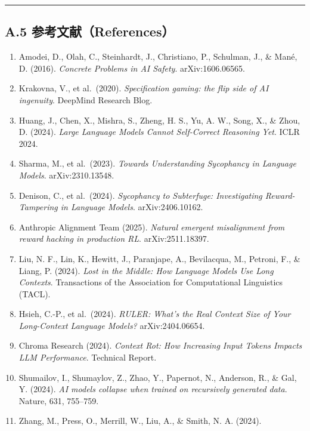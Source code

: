 \begin{center}\rule{0.5\linewidth}{0.5pt}\end{center}

\subsection{A.5
参考文献（References）}\label{a.5-ux53c2ux8003ux6587ux732ereferences}

\begin{enumerate}
\def\labelenumi{\arabic{enumi}.}
\tightlist
\item
  Amodei, D., Olah, C., Steinhardt, J., Christiano, P., Schulman, J., \&
  Mané, D. (2016). \emph{Concrete Problems in AI Safety}.
  arXiv:1606.06565.
\item
  Krakovna, V., et al.~(2020). \emph{Specification gaming: the flip side
  of AI ingenuity}. DeepMind Research Blog.
\item
  Huang, J., Chen, X., Mishra, S., Zheng, H. S., Yu, A. W., Song, X., \&
  Zhou, D. (2024). \emph{Large Language Models Cannot Self-Correct
  Reasoning Yet}. ICLR 2024.
\item
  Sharma, M., et al.~(2023). \emph{Towards Understanding Sycophancy in
  Language Models}. arXiv:2310.13548.
\item
  Denison, C., et al.~(2024). \emph{Sycophancy to Subterfuge:
  Investigating Reward-Tampering in Language Models}. arXiv:2406.10162.
\item
  Anthropic Alignment Team (2025). \emph{Natural emergent misalignment
  from reward hacking in production RL}. arXiv:2511.18397.
\item
  Liu, N. F., Lin, K., Hewitt, J., Paranjape, A., Bevilacqua, M.,
  Petroni, F., \& Liang, P. (2024). \emph{Lost in the Middle: How
  Language Models Use Long Contexts}. Transactions of the Association
  for Computational Linguistics (TACL).
\item
  Hsieh, C.-P., et al.~(2024). \emph{RULER: What's the Real Context Size
  of Your Long-Context Language Models?} arXiv:2404.06654.
\item
  Chroma Research (2024). \emph{Context Rot: How Increasing Input Tokens
  Impacts LLM Performance}. Technical Report.
\item
  Shumailov, I., Shumaylov, Z., Zhao, Y., Papernot, N., Anderson, R., \&
  Gal, Y. (2024). \emph{AI models collapse when trained on recursively
  generated data}. Nature, 631, 755--759.
\item
  Zhang, M., Press, O., Merrill, W., Liu, A., \& Smith, N. A. (2024).

\end{enumerate}
